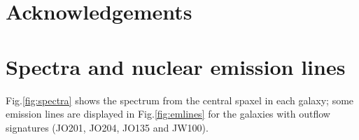 \documentclass[fleqn,usenatbib]{mnras}
\begin{document}
\section*{Acknowledgements}









\appendix



\section{Spectra and nuclear emission lines}
\label{app:spectra}

Fig.\ref{fig:spectra} shows the spectrum from the central spaxel in each galaxy; some emission lines are displayed in Fig.\ref{fig:emlines} for the galaxies with outflow signatures (JO201, JO204, JO135 and JW100).
\end{document}
